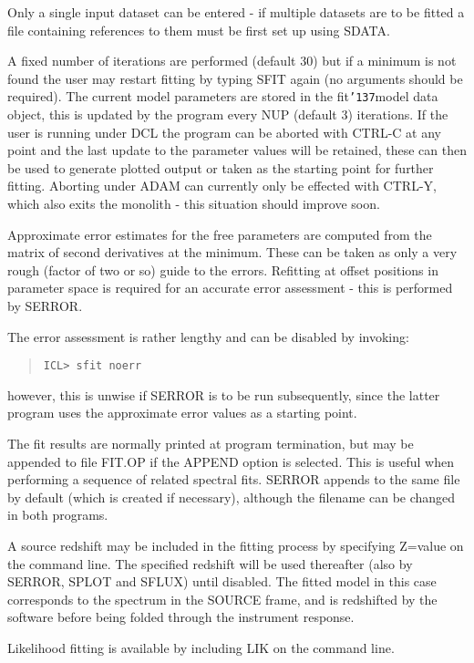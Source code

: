 \documentclass{book}
\renewcommand{\_}{{\tt\char'137}}     %
\begin{document}
Only a single input dataset can be entered - if multiple datasets
are to be fitted a file containing references to them must be
first set up using SDATA.

A fixed number of iterations are performed (default 30) but if a
minimum is not found the user may restart fitting by typing SFIT
again (no arguments should be required). The current model
parameters are stored in the fit\_model data object, this is
updated by the program every NUP (default 3) iterations. If the
user is running under DCL the program can be aborted with CTRL-C at
any point and the last update to the parameter values will be
retained, these can then be used to generate plotted output or
taken as the starting point for further fitting. Aborting under
ADAM can currently only be effected with CTRL-Y, which also exits
the monolith - this situation should improve soon.

Approximate error estimates for the free parameters are computed
from the matrix of second derivatives at the minimum. These can
be taken as only a very rough (factor of two or so) guide to the
errors. Refitting at offset positions in parameter space is
required for an accurate error assessment - this is performed by
SERROR.

The error assessment is rather lengthy and can be disabled by
invoking:
\begin{quote}\begin{verbatim}
ICL> sfit noerr
\end{verbatim}\end{quote}
however, this is unwise if SERROR is to be run subsequently,
since the latter program uses the approximate error values as a
starting point.

The fit results are normally printed at program termination, but
may be appended to file FIT.OP if the APPEND option is selected.
This is useful when performing a sequence of related spectral
fits. SERROR appends to the same file by default (which is created
if necessary), although the filename can be changed in both programs.

A source redshift may be included in the fitting process by
specifying Z=value on the command line. The specified redshift
will be used thereafter (also by SERROR, SPLOT and SFLUX) until
disabled. The fitted model in this case corresponds to the
spectrum in the SOURCE frame, and is redshifted by the software
before being folded through the instrument response.

Likelihood fitting is available by including LIK on the
command line.
\end{document}
